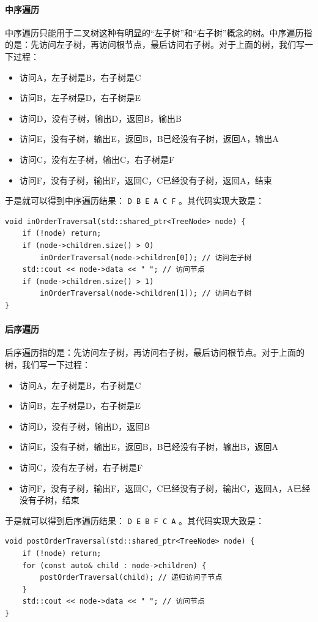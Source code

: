 \paragraph{中序遍历} 中序遍历只能用于二叉树这种有明显的“左子树”和“右子树”概念的树。中序遍历指的是：先访问左子树，再访问根节点，最后访问右子树。对于上面的树，我们写一下过程：
\begin{itemize}
    \item 访问A，左子树是B，右子树是C
    \item 访问B，左子树是D，右子树是E
    \item 访问D，没有子树，输出D，返回B，输出B
    \item 访问E，没有子树，输出E，返回B，B已经没有子树，返回A，输出A
    \item 访问C，没有左子树，输出C，右子树是F
    \item 访问F，没有子树，输出F，返回C，C已经没有子树，返回A，结束
\end{itemize}
于是就可以得到中序遍历结果： \texttt{D B E A C F} 。其代码实现大致是：
\begin{verbatim}
void inOrderTraversal(std::shared_ptr<TreeNode> node) {
    if (!node) return;
    if (node->children.size() > 0)
        inOrderTraversal(node->children[0]); // 访问左子树
    std::cout << node->data << " "; // 访问节点
    if (node->children.size() > 1)
        inOrderTraversal(node->children[1]); // 访问右子树
}
\end{verbatim}

\paragraph{后序遍历} 后序遍历指的是：先访问左子树，再访问右子树，最后访问根节点。对于上面的树，我们写一下过程：
\begin{itemize}
    \item 访问A，左子树是B，右子树是C
    \item 访问B，左子树是D，右子树是E
    \item 访问D，没有子树，输出D，返回B
    \item 访问E，没有子树，输出E，返回B，B已经没有子树，输出B，返回A
    \item 访问C，没有左子树，右子树是F
    \item 访问F，没有子树，输出F，返回C，C已经没有子树，输出C，返回A，A已经没有子树，结束
\end{itemize}
于是就可以得到后序遍历结果： \texttt{D E B F C A} 。其代码实现大致是：
\begin{verbatim}
void postOrderTraversal(std::shared_ptr<TreeNode> node) {
    if (!node) return;
    for (const auto& child : node->children) {
        postOrderTraversal(child); // 递归访问子节点
    }
    std::cout << node->data << " "; // 访问节点
}
\end{verbatim}

